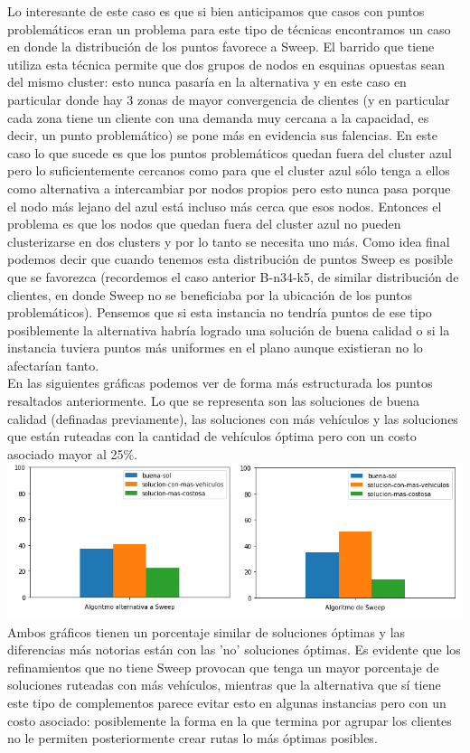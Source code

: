 \documentclass[11pt,a4paper]{article}
\begin{document}
Lo interesante de este caso es que si bien anticipamos que casos con puntos problemáticos eran un problema para este tipo de técnicas encontramos un caso en donde la distribución de los puntos favorece a Sweep. El barrido que tiene utiliza esta técnica permite que dos grupos de nodos en esquinas opuestas sean del mismo cluster: esto nunca pasaría en la alternativa y en este caso en particular donde hay 3 zonas de mayor convergencia de clientes (y en particular cada zona tiene un cliente con una demanda muy cercana a la capacidad, es decir, un punto problemático) se pone más en evidencia sus falencias. En este caso lo que sucede es que los puntos problemáticos quedan fuera del cluster azul pero lo suficientemente cercanos como para que el cluster azul sólo tenga a ellos como alternativa a intercambiar por nodos propios pero esto nunca pasa porque el nodo más lejano del azul está incluso más cerca que esos nodos. Entonces el problema es que los nodos que quedan fuera del cluster azul no pueden clusterizarse en dos clusters y por lo tanto se necesita uno más. Como idea final podemos decir que cuando tenemos esta distribución de puntos Sweep es posible que se favorezca (recordemos el caso anterior B-n34-k5, de similar distribución de clientes, en donde Sweep no se beneficiaba por la ubicación de los puntos problemáticos). Pensemos que si esta instancia no tendría puntos de ese tipo posiblemente la alternativa habría logrado una solución de buena calidad o si la instancia tuviera puntos más uniformes en el plano aunque existieran no lo afectarían tanto.
\\


\bigskip
En las siguientes gráficas podemos ver de forma más estructurada los puntos resaltados anteriormente. Lo que se representa son las soluciones de buena calidad (definadas previamente), las soluciones con más vehículos y las soluciones que están ruteadas con la cantidad de vehículos óptima pero con un costo asociado mayor al 25\%.
\includegraphics[scale=.8]{graf/calidades_sweep_alternativa.png}
 Ambos gráficos tienen un porcentaje similar de soluciones óptimas y las diferencias más notorias están con las 'no' soluciones óptimas. Es evidente que los refinamientos que no tiene Sweep provocan que tenga un mayor porcentaje de soluciones ruteadas con más vehículos, mientras que la alternativa que sí tiene este tipo de complementos parece evitar esto en algunas instancias pero con un costo asociado: posiblemente la forma en la que termina por agrupar los clientes no le permiten posteriormente crear rutas lo más óptimas posibles.
 
\end{document}
